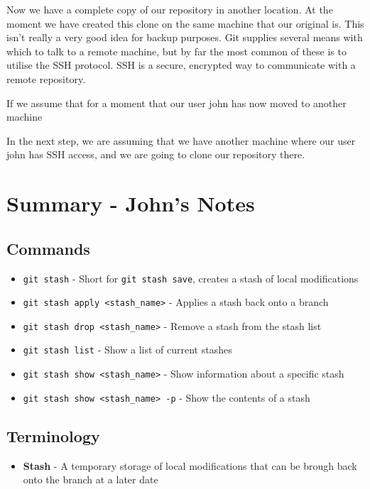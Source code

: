 Now we have a complete copy of our repository in another location.  At the moment we have created this clone on the same machine that our original is.  This isn't really a very good idea for backup purposes.  Git supplies several means with which to talk to a remote machine, but by far the most common of these is to utilise the SSH protocol.  SSH is a secure, encrypted way to communicate with a remote repository.  

If we assume that for a moment that our user john has now moved to another machine

In the next step, we are assuming that we have another machine where our user john has SSH access, and we are going to clone our repository there.









\clearpage

\section{Summary - John's Notes}
\subsection{Commands}
\begin{itemize}

\item\texttt{git stash} - Short for \texttt{git stash save}, creates a stash of local modifications

\item\texttt{git stash apply <stash\_name>} - Applies a stash back onto a branch

\item\texttt{git stash drop <stash\_name>} - Remove a stash from the stash list

\item\texttt{git stash list} - Show a list of current stashes

\item\texttt{git stash show <stash\_name>} - Show information about a specific stash

\item\texttt{git stash show <stash\_name> -p} - Show the contents of a stash

\end{itemize}

\subsection{Terminology}
\begin{itemize}
\item\textbf{Stash} - A temporary storage of local modifications that can be brough back onto the branch at a later date
\end{itemize}
